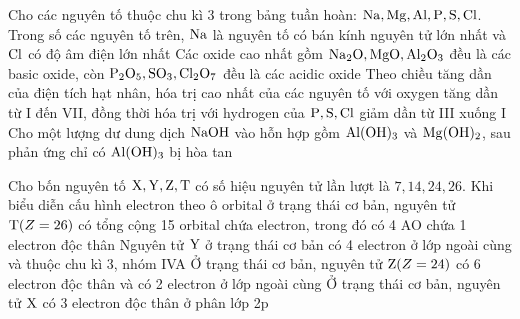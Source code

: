 \documentclass[11pt,a4paper]{article}
\begin{document}
\begin{ex}
Cho các nguyên tố thuộc chu kì 3 trong bảng tuần hoàn: $\ce{Na, Mg, Al, P, S, Cl}$.
\choiceTF
{\True Trong số các nguyên tố trên, $\ce{Na}$ là nguyên tố có bán kính nguyên tử lớn nhất và $\ce{Cl}$ có độ âm điện lớn nhất}
{Các oxide cao nhất gồm $\ce{Na2O, MgO, Al2O3}$ đều là các basic oxide, còn $\ce{P2O5, SO3, Cl2O7}$ đều là các acidic oxide}
{\True Theo chiều tăng dần của điện tích hạt nhân, hóa trị cao nhất của các nguyên tố với oxygen tăng dần từ I đến VII, đồng thời hóa trị với hydrogen của $\ce{P, S, Cl}$ giảm dần từ III xuống I}
{\True Cho một lượng dư dung dịch $\ce{NaOH}$ vào hỗn hợp gồm $\ce{Al(OH)3}$ và $\ce{Mg(OH)2}$, sau phản ứng chỉ có $\ce{Al(OH)3}$ bị hòa tan}

\end{ex}
\begin{ex}
Cho bốn nguyên tố $\ce{X, Y, Z, T}$ có số hiệu nguyên tử lần lượt là $7, 14, 24, 26$.
\choiceTF
{\True Khi biểu diễn cấu hình electron theo ô orbital ở trạng thái cơ bản, nguyên tử $\ce{T} (Z = 26)$ có tổng cộng 15 orbital chứa electron, trong đó có 4 AO chứa 1 electron độc thân}
{\True Nguyên tử $\ce{Y}$ ở trạng thái cơ bản có 4 electron ở lớp ngoài cùng và thuộc chu kì 3, nhóm IVA}
{Ở trạng thái cơ bản, nguyên tử $\ce{Z} (Z = 24)$ có 6 electron độc thân và có 2 electron ở lớp ngoài cùng}
{\True Ở trạng thái cơ bản, nguyên tử $\ce{X}$ có 3 electron độc thân ở phân lớp 2p}

\end{ex}
\end{document}
